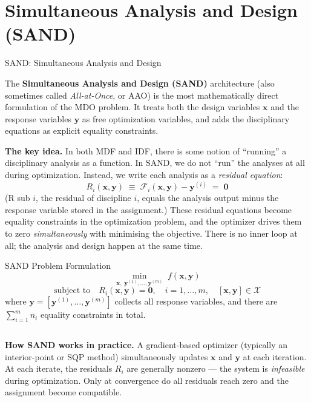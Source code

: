 \documentclass[aspectratio=169,10pt]{beamer}
\begin{document}
\section{Simultaneous Analysis and Design (SAND)}

\begin{frame}[allowframebreaks]{SAND: Simultaneous Analysis and Design}

  The \textbf{Simultaneous Analysis and Design (SAND)} architecture
  (also sometimes called \emph{All-at-Once}, or AAO) is the most
  mathematically direct formulation of the MDO problem.  It treats
  both the design variables $\mathbf{x}$ and the response variables
  $\mathbf{y}$ as free optimization variables, and adds the disciplinary
  equations as explicit equality constraints.

  \textbf{The key idea.}  In both MDF and IDF, there is some notion of
  ``running'' a disciplinary analysis as a function.  In SAND, we do not
  ``run'' the analyses at all during optimization.  Instead, we write
  each analysis as a \emph{residual equation}:
  \[
    R_i(\mathbf{x}, \mathbf{y}) \;\equiv\; \mathcal{F}_i(\mathbf{x},
    \mathbf{y}) - \mathbf{y}^{(i)} \;=\; \mathbf{0}
  \]
  (R sub $i$, the residual of discipline $i$, equals the analysis output
  minus the response variable stored in the assignment.)  These residual
  equations become equality constraints in the optimization problem, and
  the optimizer drives them to zero \emph{simultaneously} with minimising
  the objective.  There is no inner loop at all; the analysis and design
  happen at the same time.

  \begin{block}{SAND Problem Formulation}
    \[
      \min_{\mathbf{x},\;\mathbf{y}^{(1)},\ldots,\mathbf{y}^{(m)}}\;
      f\!\left(\mathbf{x}, \mathbf{y}\right)
    \]
    \[
      \text{subject to} \quad
      R_i(\mathbf{x}, \mathbf{y}) = \mathbf{0}, \quad i = 1, \ldots, m,
      \quad \left[\mathbf{x}, \mathbf{y}\right] \in \mathcal{X}
    \]
    where $\mathbf{y} = [\mathbf{y}^{(1)}, \ldots, \mathbf{y}^{(m)}]$
    collects all response variables, and there are $\sum_{i=1}^m n_i$
    equality constraints in total.
  \end{block}

  \framebreak

  \begin{columns}[T]
    \textbf{How SAND works in practice.}  A gradient-based optimizer
    (typically an interior-point or SQP method) simultaneously updates
    $\mathbf{x}$ and $\mathbf{y}$ at each iteration.  At each iterate,
    the residuals $R_i$ are generally nonzero --- the system is
    \emph{infeasible} during optimization.  Only at convergence do all
    residuals reach zero and the assignment become compatible.


\end{columns}
\end{frame}
\end{document}

